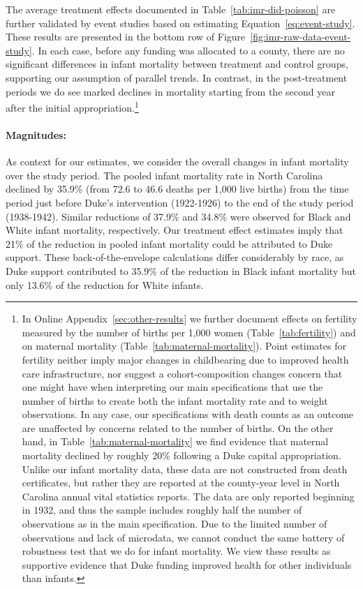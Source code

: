 \documentclass[12pt]{article}
\begin{document}
The average treatment effects documented in Table~\ref{tab:imr-did-poisson} are further validated by event studies based on estimating Equation~\ref{eq:event-study}.
These results are presented in the bottom row of Figure~\ref{fig:imr-raw-data-event-study}.
In each case, before any funding was allocated to a county, there are no significant differences in infant mortality between treatment and control groups, supporting our assumption of parallel trends.
In contrast, in the post-treatment periods we do see marked declines in mortality starting from the second year after the initial appropriation.\footnote{In Online Appendix~\ref{sec:other-results} we further document effects on fertility measured by the number of births per 1,000 women (Table~\ref{tab:fertility}) and on maternal mortality (Table~\ref{tab:maternal-mortality}). 
Point estimates for fertility neither imply major changes in childbearing due to improved health care infrastructure, nor suggest a cohort-composition changes concern that one might have when interpreting our main specifications that use the number of births to create both the infant mortality rate and to weight observations. 
In any case, our specifications with death counts as an outcome are unaffected by concerns related to the number of births. 
On the other hand, in Table~\ref{tab:maternal-mortality} we find evidence that maternal mortality declined by roughly 20\% following a Duke capital appropriation. 
Unlike our infant mortality data, these data are not constructed from death certificates, but rather they are reported at the county-year level in North Carolina annual vital statistics reports. 
The data are only reported beginning in 1932, and thus the sample includes roughly half the number of observations as in the main specification. 
Due to the limited number of observations and lack of microdata, we cannot conduct the same battery of robustness test that we do for infant mortality. 
We view these results as supportive evidence that Duke funding improved health for other individuals than infants.}


\paragraph{Magnitudes:} As context for our estimates, we consider the overall changes in infant mortality over the study period.
The pooled infant mortality rate in North Carolina declined by 35.9\% (from 72.6 to 46.6 deaths per 1,000 live births) from the time period just before Duke's intervention (1922-1926) to the end of the study period (1938-1942). Similar reductions of 37.9\% and 34.8\% were observed for Black and White infant mortality, respectively.
Our treatment effect estimates imply that 21\% of the reduction in pooled infant mortality could be attributed to Duke support.
These back-of-the-envelope calculations differ considerably by race, as Duke support contributed to 35.9\% of the reduction in Black infant mortality but only 13.6\% of the reduction for White infants. 
\end{document}
